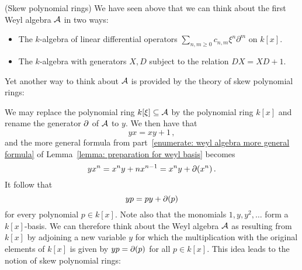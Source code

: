 

\begin{remark}(Skew polynomial rings)
  \label{remark: skew polynomial rings}
  We have seen above that we can think about the first Weyl algebra $\operatorname{\mathcal{A}}$ in two ways:
  \begin{itemize}
    \item
      The $k$-algebra of linear differential operators $\sum_{n,m \geq 0} c_{n,m} \xi^n \partial^m$ on $k[x]$.
    \item
      The $k$-algebra with generators $X, D$ subject to the relation $D X = X D + 1$.
  \end{itemize}
  Yet another way to think about $\operatorname{\mathcal{A}}$ is provided by the theory of skew polynomial rings:
  
  We may replace the polynomial ring $k[\xi] \subseteq \operatorname{\mathcal{A}}$ by the polynomial ring $k[x]$ and rename the generator $\partial$ of $\operatorname{\mathcal{A}}$ to $y$.
  We then have that
  \[
    yx = xy + 1 \,,
  \]
  and the more general formula from part~\ref*{enumerate: weyl algebra more general formula} of Lemma~\ref{lemma: preparation for weyl basis} becomes
  \[
      y x^n
    = x^n y + n x^{n-1}
    = x^n y + \partial(x^n) \,.
  \]
  It follow that
  \[
      y p
    = p y + \partial(p)
  \]
  for every polynomial $p \in k[x]$.
  Note also that the monomials $1, y, y^2, \dotsc$ form a $k[x]$-basis.
  We can therefore think about the Weyl algebra $\operatorname{\mathcal{A}}$ as resulting from $k[x]$ by adjoining a new variable $y$ for which the multiplication with the original elements of $k[x]$ is given by $y p = \partial(p)$ for all $p \in k[x]$.
  This idea leads to the notion of skew polynomial rings:
  

\end{remark}
